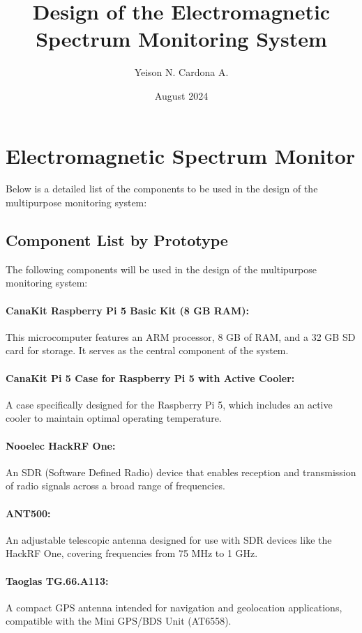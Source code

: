 \documentclass{article}
\title{Design of the Electromagnetic Spectrum Monitoring System}
\author{Yeison N. Cardona A.}
\date{August 2024}
\begin{document}
\maketitle

\section{Electromagnetic Spectrum Monitor}

Below is a detailed list of the components to be used in the design of the multipurpose monitoring system:

\subsection{Component List by Prototype}

The following components will be used in the design of the multipurpose monitoring system:

\paragraph{CanaKit Raspberry Pi 5 Basic Kit (8 GB RAM):} This microcomputer features an ARM processor, 8 GB of RAM, and a 32 GB SD card for storage. It serves as the central component of the system.

\paragraph{CanaKit Pi 5 Case for Raspberry Pi 5 with Active Cooler:} A case specifically designed for the Raspberry Pi 5, which includes an active cooler to maintain optimal operating temperature.

\paragraph{Nooelec HackRF One:} An SDR (Software Defined Radio) device that enables reception and transmission of radio signals across a broad range of frequencies.

\paragraph{ANT500:} An adjustable telescopic antenna designed for use with SDR devices like the HackRF One, covering frequencies from 75 MHz to 1 GHz.

\paragraph{Taoglas TG.66.A113:} A compact GPS antenna intended for navigation and geolocation applications, compatible with the Mini GPS/BDS Unit (AT6558).
\end{document}
